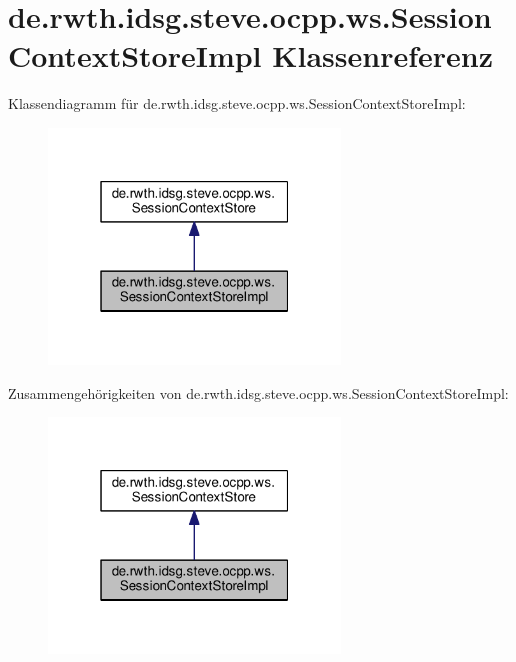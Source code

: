 \hypertarget{classde_1_1rwth_1_1idsg_1_1steve_1_1ocpp_1_1ws_1_1_session_context_store_impl}{\section{de.\+rwth.\+idsg.\+steve.\+ocpp.\+ws.\+Session\+Context\+Store\+Impl Klassenreferenz}
\label{classde_1_1rwth_1_1idsg_1_1steve_1_1ocpp_1_1ws_1_1_session_context_store_impl}
}


Klassendiagramm für de.\+rwth.\+idsg.\+steve.\+ocpp.\+ws.\+Session\+Context\+Store\+Impl\+:\nopagebreak
\begin{figure}[H]
\begin{center}
\leavevmode
\includegraphics[width=220pt]{classde_1_1rwth_1_1idsg_1_1steve_1_1ocpp_1_1ws_1_1_session_context_store_impl__inherit__graph}
\end{center}
\end{figure}


Zusammengehörigkeiten von de.\+rwth.\+idsg.\+steve.\+ocpp.\+ws.\+Session\+Context\+Store\+Impl\+:\nopagebreak
\begin{figure}[H]
\begin{center}
\leavevmode
\includegraphics[width=220pt]{classde_1_1rwth_1_1idsg_1_1steve_1_1ocpp_1_1ws_1_1_session_context_store_impl__coll__graph}
\end{center}
\end{figure}
